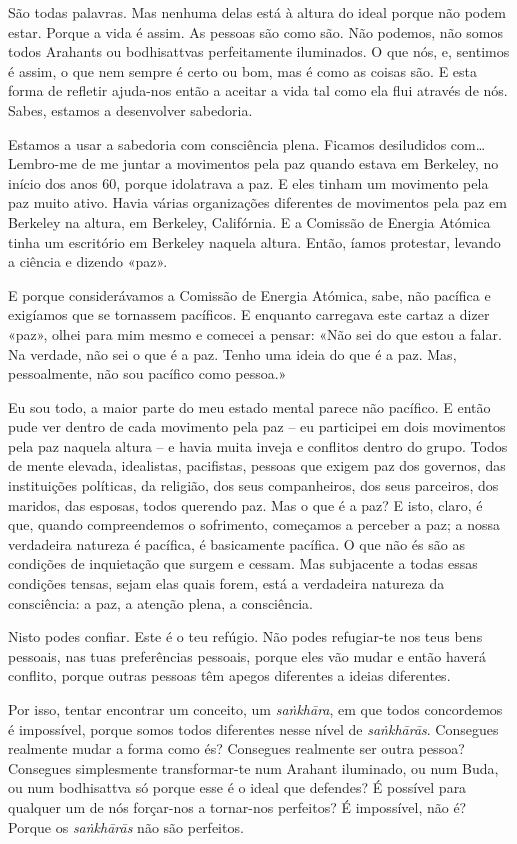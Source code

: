 São todas palavras. Mas nenhuma delas está à altura do ideal porque não podem
estar. Porque a vida é assim. As pessoas são como são. Não podemos, não somos
todos Arahants ou bodhisattvas perfeitamente iluminados. O que nós, e, sentimos
é assim, o que nem sempre é certo ou bom, mas é como as coisas são. E esta forma
de refletir ajuda-nos então a aceitar a vida tal como ela flui através de nós.
Sabes, estamos a desenvolver sabedoria.

Estamos a usar a sabedoria com consciência plena. Ficamos desiludidos
com\ldots{} Lembro-me de me juntar a movimentos pela paz quando estava em
Berkeley, no início dos anos 60, porque idolatrava a paz. E eles tinham um
movimento pela paz muito ativo. Havia várias organizações diferentes de
movimentos pela paz em Berkeley na altura, em Berkeley, Califórnia. E a Comissão
de Energia Atómica tinha um escritório em Berkeley naquela altura. Então, íamos
protestar, levando a ciência e dizendo «paz».

E porque considerávamos a Comissão de Energia Atómica, sabe, não pacífica e
exigíamos que se tornassem pacíficos. E enquanto carregava este cartaz a dizer
«paz», olhei para mim mesmo e comecei a pensar: «Não sei do que estou a falar.
Na verdade, não sei o que é a paz. Tenho uma ideia do que é a paz. Mas,
pessoalmente, não sou pacífico como pessoa.»

Eu sou todo, a maior parte do meu estado mental parece não pacífico. E então
pude ver dentro de cada movimento pela paz -- eu participei em dois movimentos
pela paz naquela altura -- e havia muita inveja e conflitos dentro do grupo.
Todos de mente elevada, idealistas, pacifistas, pessoas que exigem paz dos
governos, das instituições políticas, da religião, dos seus companheiros, dos
seus parceiros, dos maridos, das esposas, todos querendo paz. Mas o que é a paz?
E isto, claro, é que, quando compreendemos o sofrimento, começamos a perceber a
paz; a nossa verdadeira natureza é pacífica, é basicamente pacífica. O que não
és são as condições de inquietação que surgem e cessam. Mas subjacente a todas
essas condições tensas, sejam elas quais forem, está a verdadeira natureza da
consciência: a paz, a atenção plena, a consciência.

Nisto podes confiar. Este é o teu refúgio. Não podes refugiar-te nos teus bens
pessoais, nas tuas preferências pessoais, porque eles vão mudar e então haverá
conflito, porque outras pessoas têm apegos diferentes a ideias diferentes.

Por isso, tentar encontrar um conceito, um \emph{saṅkhāra}, em que todos concordemos é
impossível, porque somos todos diferentes nesse nível de \emph{saṅkhārās}. Consegues
realmente mudar a forma como és? Consegues realmente ser outra pessoa? Consegues
simplesmente transformar-te num Arahant iluminado, ou num Buda, ou num
bodhisattva só porque esse é o ideal que defendes? É possível para qualquer um
de nós forçar-nos a tornar-nos perfeitos? É impossível, não é? Porque os
\emph{saṅkhārās} não são perfeitos.

